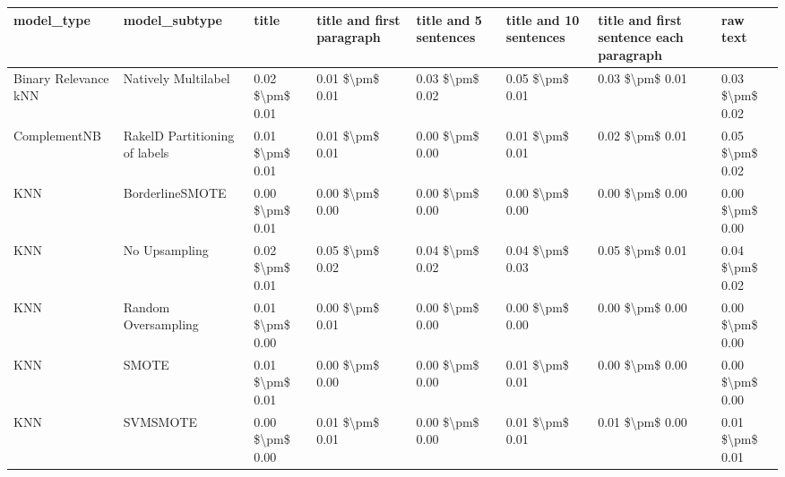 \begin{tabular}{llllllll}
\toprule
                     model\_type &                 model\_subtype &           title & title and first paragraph & title and 5 sentences & title and 10 sentences & title and first sentence each paragraph &            raw text \\
\midrule
           Binary Relevance kNN &           Natively Multilabel & 0.02 \$\textbackslash pm\$ 0.01 &           0.01 \$\textbackslash pm\$ 0.01 &       0.03 \$\textbackslash pm\$ 0.02 &        0.05 \$\textbackslash pm\$ 0.01 &                         0.03 \$\textbackslash pm\$ 0.01 &     0.03 \$\textbackslash pm\$ 0.02 \\
                   ComplementNB & RakelD Partitioning of labels & 0.01 \$\textbackslash pm\$ 0.01 &           0.01 \$\textbackslash pm\$ 0.01 &       0.00 \$\textbackslash pm\$ 0.00 &        0.01 \$\textbackslash pm\$ 0.01 &                         0.02 \$\textbackslash pm\$ 0.01 &     0.05 \$\textbackslash pm\$ 0.02 \\
                            KNN &               BorderlineSMOTE & 0.00 \$\textbackslash pm\$ 0.01 &           0.00 \$\textbackslash pm\$ 0.00 &       0.00 \$\textbackslash pm\$ 0.00 &        0.00 \$\textbackslash pm\$ 0.00 &                         0.00 \$\textbackslash pm\$ 0.00 &     0.00 \$\textbackslash pm\$ 0.00 \\
                            KNN &                 No Upsampling & 0.02 \$\textbackslash pm\$ 0.01 &           0.05 \$\textbackslash pm\$ 0.02 &       0.04 \$\textbackslash pm\$ 0.02 &        0.04 \$\textbackslash pm\$ 0.03 &                         0.05 \$\textbackslash pm\$ 0.01 &     0.04 \$\textbackslash pm\$ 0.02 \\
                            KNN &           Random Oversampling & 0.01 \$\textbackslash pm\$ 0.00 &           0.00 \$\textbackslash pm\$ 0.01 &       0.00 \$\textbackslash pm\$ 0.00 &        0.00 \$\textbackslash pm\$ 0.00 &                         0.00 \$\textbackslash pm\$ 0.00 &     0.00 \$\textbackslash pm\$ 0.00 \\
                            KNN &                         SMOTE & 0.01 \$\textbackslash pm\$ 0.01 &           0.00 \$\textbackslash pm\$ 0.00 &       0.00 \$\textbackslash pm\$ 0.00 &        0.01 \$\textbackslash pm\$ 0.01 &                         0.00 \$\textbackslash pm\$ 0.00 &     0.00 \$\textbackslash pm\$ 0.00 \\
                            KNN &                      SVMSMOTE & 0.00 \$\textbackslash pm\$ 0.00 &           0.01 \$\textbackslash pm\$ 0.01 &       0.00 \$\textbackslash pm\$ 0.00 &        0.01 \$\textbackslash pm\$ 0.01 &                         0.01 \$\textbackslash pm\$ 0.00 &     0.01 \$\textbackslash pm\$ 0.01 \\

\end{tabular}
